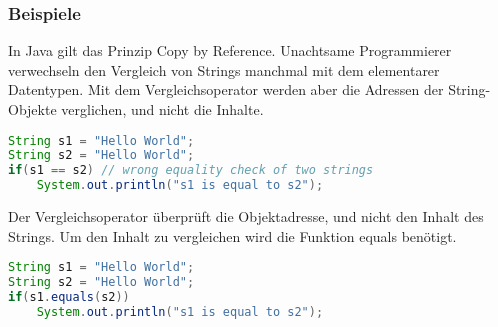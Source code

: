 \subsubsection{Beispiele}


In Java gilt das Prinzip \glqq{}Copy by Reference\grqq{}. Unachtsame Programmierer verwechseln den Vergleich von Strings manchmal mit dem elementarer Datentypen. Mit dem Vergleichsoperator werden aber die Adressen der String-Objekte verglichen, und nicht die Inhalte.

\begin{lstlisting}[language=Java]
String s1 = "Hello World";
String s2 = "Hello World";
if(s1 == s2) // wrong equality check of two strings
	System.out.println("s1 is equal to s2");
\end{lstlisting}

Der Vergleichsoperator \"uberpr\"uft die Objektadresse, und nicht den Inhalt des Strings. Um den Inhalt zu vergleichen wird die Funktion equals ben\"otigt.

\begin{lstlisting}[language=Java]
String s1 = "Hello World";
String s2 = "Hello World";
if(s1.equals(s2))
	System.out.println("s1 is equal to s2");
\end{lstlisting}




